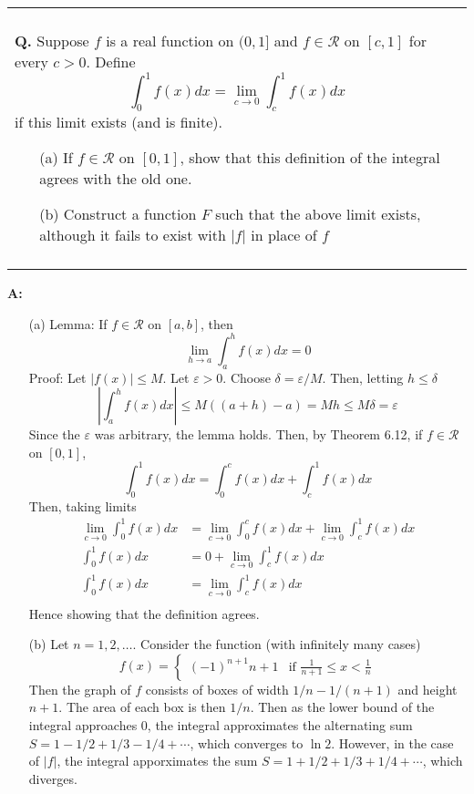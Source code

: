 \documentclass{article}
\newenvironment{myboxed}{\noindent\begin{tabular}{|p{.975\linewidth}|}\hline \\}{\\\\\hline\end{tabular}}
\newcounter{Question}
\newenvironment{Question} 
{\bigskip\begin{myboxed}\refstepcounter{Question}\par\noindent\textbf{Q\theQuestion.}}
{\end{myboxed}\bigskip}
\newenvironment{Answer} {\par\noindent\textbf{A:}} {}
\begin{document}
\newpage
\begin{Question}
    Suppose $f$ is a real function on $(0, 1]$ and $f \in \mathscr{R}$ on $[c,1]$ for every $c > 0$. Define
    \[\int_0^1 f(x) dx = \lim_{c\to 0} \int_c^1 f(x)dx\]
    if this limit exists (and is finite).
    \begin{itemize}
        \item[(a)] If $f \in \mathscr{R}$ on $[0, 1]$, show that this definition of the integral agrees with the old one.
        \item[(b)] Construct a function $F$ such that the above limit exists, although it fails to exist with $|f|$ in place of $f$
    \end{itemize}
\end{Question}
\begin{Answer}
    \begin{itemize}
        \item[(a)]
            Lemma: If $f \in \mathscr{R}$ on $[a ,b]$, then
            \[\lim_{h \to a} \int_a^h f(x)dx = 0\]
            Proof: Let $|f(x)| \leq M$. Let $\varepsilon > 0$. Choose $\delta = \varepsilon/M$. Then, letting $h \leq \delta$
            \[\left|\int_a^h f(x) dx\right| \leq M((a+h) - a) = Mh \leq M\delta = \varepsilon\]
            Since the $\varepsilon$ was arbitrary, the lemma holds.
            Then, by Theorem 6.12, if $f \in \mathscr{R}$ on $[0, 1]$,
            \[\int_0^1 f(x)dx = \int_0^c f(x)dx + \int_c^1 f(x)dx\]
            Then, taking limits
            \begin{align*}
                \lim_{c \to 0} \int_0^1 f(x)dx &= \lim_{c \to 0}\int_0^c f(x)dx + \lim_{c \to 0}\int_c^1 f(x)dx \\
                \int_0^1 f(x)dx &= 0 + \lim_{c \to 0}\int_c^1 f(x)dx \\
                \int_0^1 f(x)dx &= \lim_{c \to 0}\int_c^1 f(x)dx \\
            \end{align*}
            Hence showing that the definition agrees.
        \item[(b)]
            Let $n = 1, 2, \ldots$. Consider the function (with infinitely many cases)
            \[f(x) = \begin{cases}
                (-1)^{n+1}n+1 & \text{if } \frac{1}{n+1} \leq x < \frac{1}{n}
            \end{cases}\]
            Then the graph of $f$ consists of boxes of width $1/n - 1/(n+1)$ and height $n+1$. The area of each box is then $1/n$. Then as the lower bound of the integral approaches $0$, the integral approximates the alternating sum $S = 1 - 1/2 + 1/3 - 1/4 + \cdots$, which converges to $\ln 2$.
            However, in the case of $|f|$, the integral apporximates the sum $S = 1 + 1/2 + 1/3 + 1/4 + \cdots$, which diverges.
    \end{itemize}
\end{Answer}
\end{document}
